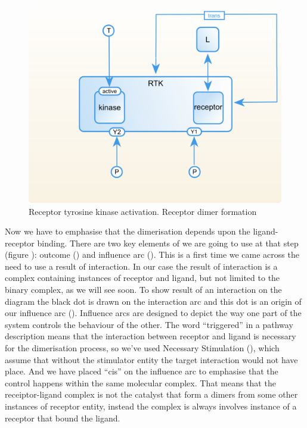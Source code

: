 \begin{figure}[H]
  \centering
  \vspace*{-0.75em}
  \includegraphics[scale=0.75]{examples/rtk-dimerisation.png}
   \caption{Receptor tyrosine kinase activation. Receptor dimer formation}
  \label{fig:rtk-dimerisation}
\end{figure}

Now we have to emphasise that the dimerisation depends upon the ligand-receptor binding. There are two key elements of \SBGNERLone we are going to use at that step (figure ): outcome () and influence arc (). This is a first time we came across the need to use a result of interaction. In our case the result of interaction  is a complex containing instances of receptor and ligand, but not limited to the binary complex, as we will see soon. To show result of an interaction on the diagram the black dot is drawn on the interaction arc and this dot is an origin of our influence arc (). Influence arcs are designed to depict the way one part of the system controls the behaviour of the other. The word ``triggered'' in a pathway description means that the interaction between receptor and ligand is necessary for the dimerisation process, so we've used Necessary Stimulation (), which assume that without the stimulator entity the target interaction would not have place. And we have placed ``cis''  on the influence arc to emphasise that the control happens within the same molecular complex. That means that the receiptor-ligand complex is not the catalyst that form a dimers from some other instances of receptor entity, instead the complex is always involves instance of a receptor that bound the ligand.
 
